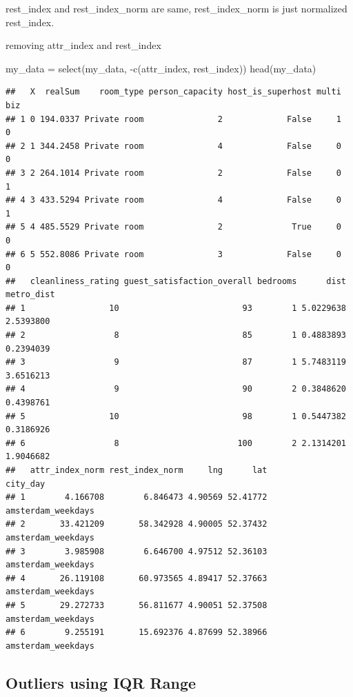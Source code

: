 \documentclass[
]{article}
\newenvironment{Shaded}{\begin{snugshade}}{\end{snugshade}}
\newcommand{\FunctionTok}[1]{\textcolor[rgb]{0.00,0.00,0.00}{#1}}
\newcommand{\NormalTok}[1]{#1}
\newcommand{\OtherTok}[1]{\textcolor[rgb]{0.56,0.35,0.01}{#1}}
\newcommand{\SpecialCharTok}[1]{\textcolor[rgb]{0.00,0.00,0.00}{#1}}
\begin{document}
rest\_index and rest\_index\_norm are same, rest\_index\_norm is just
normalized rest\_index.

removing attr\_index and rest\_index

\begin{Shaded}
\begin{Highlighting}[]
\NormalTok{my\_data }\OtherTok{=} \FunctionTok{select}\NormalTok{(my\_data, }\SpecialCharTok{{-}}\FunctionTok{c}\NormalTok{(attr\_index, rest\_index))}
\FunctionTok{head}\NormalTok{(my\_data)}
\end{Highlighting}
\end{Shaded}

\begin{verbatim}
##   X  realSum    room_type person_capacity host_is_superhost multi biz
## 1 0 194.0337 Private room               2             False     1   0
## 2 1 344.2458 Private room               4             False     0   0
## 3 2 264.1014 Private room               2             False     0   1
## 4 3 433.5294 Private room               4             False     0   1
## 5 4 485.5529 Private room               2              True     0   0
## 6 5 552.8086 Private room               3             False     0   0
##   cleanliness_rating guest_satisfaction_overall bedrooms      dist metro_dist
## 1                 10                         93        1 5.0229638  2.5393800
## 2                  8                         85        1 0.4883893  0.2394039
## 3                  9                         87        1 5.7483119  3.6516213
## 4                  9                         90        2 0.3848620  0.4398761
## 5                 10                         98        1 0.5447382  0.3186926
## 6                  8                        100        2 2.1314201  1.9046682
##   attr_index_norm rest_index_norm     lng      lat           city_day
## 1        4.166708        6.846473 4.90569 52.41772 amsterdam_weekdays
## 2       33.421209       58.342928 4.90005 52.37432 amsterdam_weekdays
## 3        3.985908        6.646700 4.97512 52.36103 amsterdam_weekdays
## 4       26.119108       60.973565 4.89417 52.37663 amsterdam_weekdays
## 5       29.272733       56.811677 4.90051 52.37508 amsterdam_weekdays
## 6        9.255191       15.692376 4.87699 52.38966 amsterdam_weekdays
\end{verbatim}

\hypertarget{outliers-using-iqr-range}{%
\subsection{Outliers using IQR Range}\label{outliers-using-iqr-range}}
\end{document}
